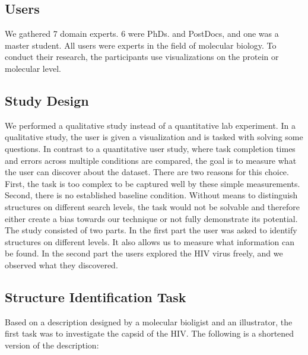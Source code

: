\documentclass[review,journal]{vgtc}         %
\begin{document}
	
	\subsection{Users}
	We gathered 7 domain experts. 6 were PhDs. and PostDocs, and one was a master student. All users were experts in the field of molecular biology. 
	To conduct their research, the participants use visualizations on the protein or molecular level.
	
	
	\subsection{Study Design}
	We performed a qualitative study instead of a quantitative lab experiment.
	In a qualitative study, the user is given a visualization and is tasked with solving some questions. 
	In contrast to a quantitative user study, where task completion times and errors across multiple conditions are compared, the goal is to measure what the user can discover about the dataset.
	There are two reasons for this choice.
	First, the task is too complex to be captured well by these simple measurements. 
	Second, there is no established baseline condition.
	Without means to distinguish structures on different search levels, the task would not be solvable and therefore either create a bias towards our technique or not fully demonstrate its potential.\\
	The study consisted of two parts. In the first part the user was asked to identify structures on different levels. 
	It also allows us to measure what information can be found.  
	In the second part the users explored the HIV virus freely, and we observed what they discovered.
	
	\subsection{Structure Identification Task}
	Based on a description designed by a molecular bioligist and an illustrator, the first task was to investigate the capsid of the HIV. 
	The following is a shortened version of the description: \\
	
\end{document}
